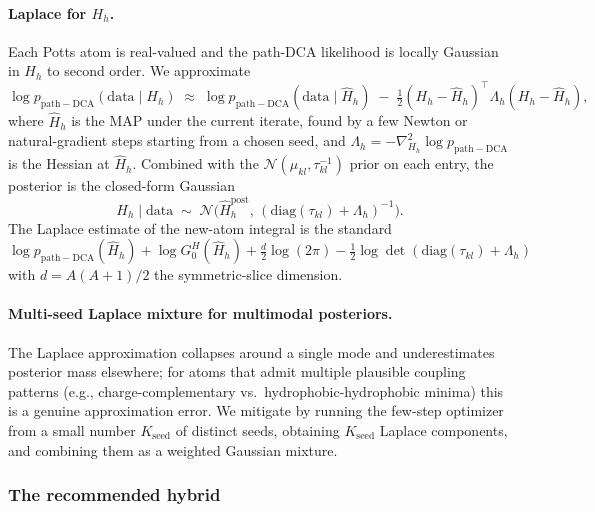 \paragraph{Laplace for $H_h$.} Each Potts atom is real-valued and
the path-DCA likelihood is locally Gaussian in $H_h$ to second
order. We approximate
\[
    \log p_{\mathrm{path-DCA}}(\mathrm{data} \mid H_h)
    \;\approx\; \log p_{\mathrm{path-DCA}}(\mathrm{data} \mid \hat H_h)
    \;-\; \tfrac{1}{2} (H_h - \hat H_h)^\top \Lambda_h (H_h - \hat H_h),
\]
where $\hat H_h$ is the MAP under the current iterate, found by a
few Newton or natural-gradient steps starting from a chosen seed,
and $\Lambda_h = -\nabla^2_{H_h} \log p_{\mathrm{path-DCA}}$ is the
Hessian at $\hat H_h$. Combined with the
$\mathcal{N}(\mu_{kl}, \tau_{kl}^{-1})$ prior on each entry, the
posterior is the closed-form Gaussian
\[
    H_h \mid \mathrm{data} \;\sim\;
    \mathcal{N}\!\bigl(\hat H_h^{\mathrm{post}},\, (\mathrm{diag}(\tau_{kl}) + \Lambda_h)^{-1}\bigr).
\]
The Laplace estimate of the new-atom integral is the standard
$\log p_{\mathrm{path-DCA}}(\hat H_h) + \log G_0^H(\hat H_h) + \tfrac{d}{2}\log(2\pi) - \tfrac{1}{2}\log\det(\mathrm{diag}(\tau_{kl}) + \Lambda_h)$
with $d = A(A+1)/2$ the symmetric-slice dimension.

\paragraph{Multi-seed Laplace mixture for multimodal posteriors.}
The Laplace approximation collapses around a single mode and
underestimates posterior mass elsewhere; for atoms that admit
multiple plausible coupling patterns (e.g., charge-complementary
vs.\ hydrophobic-hydrophobic minima) this is a genuine approximation
error. We mitigate by running the few-step optimizer from a small
number $K_{\mathrm{seed}}$ of distinct seeds, obtaining
$K_{\mathrm{seed}}$ Laplace components, and combining them as a
weighted Gaussian mixture.

\subsubsection*{The recommended hybrid}

